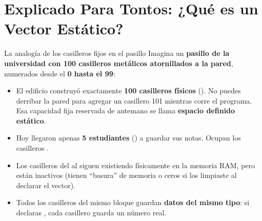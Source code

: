 \documentclass[11pt,letterpaper]{article}
\begin{document}

\tableofcontents
\vspace{8pt}

\section{Explicado Para Tontos: ¿Qué es un Vector Estático?}

\begin{paratontos}{La analogía de los casilleros fijos en el pasillo}
Imagina un \textbf{pasillo de la universidad con 100 casilleros metálicos atornillados a la pared}, numerados desde el \textbf{0 hasta el 99}:
\begin{itemize}
  \item El edificio construyó exactamente \textbf{100 casilleros físicos} (). No puedes derribar la pared para agregar un casillero 101 mientras corre el programa. Esa capacidad fija reservada de antemano se llama \textbf{espacio definido estático}.
  \item Hoy llegaron apenas \textbf{5 estudiantes} () a guardar sus notas. Ocupan los casilleros .
  \item Los casilleros del  al  siguen existiendo físicamente en la memoria RAM, pero están inactivos (tienen ``basura'' de memoria o ceros si los limpiaste al declarar el vector).
  \item Todos los casilleros del mismo bloque guardan \textbf{datos del mismo tipo}: si declaras , cada casillero guarda un número real.
\end{itemize}
\end{paratontos}
\end{document}
